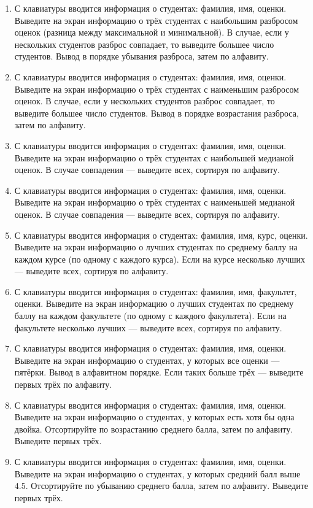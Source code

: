 \begin{enumerate}
не будут полностью исчерпаны студенты с тремя худшими показателями). Вывод надо осуществлять в порядке убывания количества двоек, а
для одинакового количества — в алфавитном порядке по фамилии и имени.
\item С клавиатуры вводится информация о студентах: фамилия, имя, оценки. Выведите на экран информацию о трёх студентах с наибольшим разбросом оценок (разница между максимальной и минимальной). В случае,
если у нескольких студентов разброс совпадает, то выведите большее число студентов. Вывод в порядке убывания разброса, затем по алфавиту.
\item С клавиатуры вводится информация о студентах: фамилия, имя, оценки. Выведите на экран информацию о трёх студентах с наименьшим разбросом оценок. В случае,
если у нескольких студентов разброс совпадает, то выведите большее число студентов. Вывод в порядке возрастания разброса, затем по алфавиту.
\item С клавиатуры вводится информация о студентах: фамилия, имя, оценки. Выведите на экран информацию о трёх студентах с наибольшей медианой оценок. В случае совпадения — выведите всех, сортируя по алфавиту.
\item С клавиатуры вводится информация о студентах: фамилия, имя, оценки. Выведите на экран информацию о трёх студентах с наименьшей медианой оценок. В случае совпадения — выведите всех, сортируя по алфавиту.
\item С клавиатуры вводится информация о студентах: фамилия, имя, курс, оценки. Выведите на экран информацию о лучших студентах по среднему баллу на каждом курсе (по одному с каждого курса). Если на курсе несколько лучших — выведите всех, сортируя по алфавиту.
\item С клавиатуры вводится информация о студентах: фамилия, имя, факультет, оценки. Выведите на экран информацию о лучших студентах по среднему баллу на каждом факультете (по одному с каждого факультета). Если на факультете несколько лучших — выведите всех, сортируя по алфавиту.
\item С клавиатуры вводится информация о студентах: фамилия, имя, оценки. Выведите на экран информацию о студентах, у которых все оценки — пятёрки. Вывод в алфавитном порядке. Если таких больше трёх — выведите первых трёх по алфавиту.
\item С клавиатуры вводится информация о студентах: фамилия, имя, оценки. Выведите на экран информацию о студентах, у которых есть хотя бы одна двойка. Отсортируйте по возрастанию среднего балла, затем по алфавиту. Выведите первых трёх.
\item С клавиатуры вводится информация о студентах: фамилия, имя, оценки. Выведите на экран информацию о студентах, у которых средний балл выше 4.5. Отсортируйте по убыванию среднего балла, затем по алфавиту. Выведите первых трёх.

\end{enumerate}
